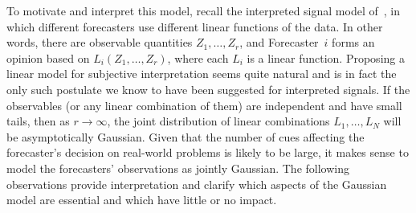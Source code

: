 \documentclass[11pt]{article}
\theoremstyle{definition}
\theoremstyle{definition}
\begin{document}
To motivate and interpret this model, recall the 
interpreted signal model of~\citet{broomell2009experts}, in which 
different forecasters use different linear functions of the data.  
In other words, there are observable quantities $Z_1 , \ldots , Z_r$, 
and Forecaster~$i$ forms an opinion based on $L_i (Z_1 , \ldots , Z_r)$, 
where each $L_i$ is a linear function.  Proposing a linear model
for subjective interpretation seems quite natural and is in fact
the only such postulate we know to have been suggested for 
interpreted signals.
If the observables (or any linear combination of them)
are independent and have small tails, then as $r \to \infty$, the
joint distribution of linear combinations $L_1 , \ldots , L_N$
will be asymptotically Gaussian.  Given that the number of cues affecting the forecaster's decision on real-world problems is likely to be large, it makes sense to model
the forecasters' observations as jointly Gaussian.  The following
observations provide interpretation and clarify which aspects of the
Gaussian model are essential and which have little or no impact.
\end{document}
